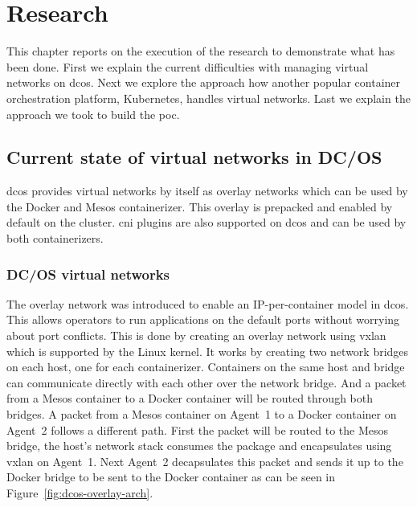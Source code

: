 \chapter{Research}
\label{chap:research}
This chapter reports on the execution of the research to demonstrate what has been done. First we explain the current difficulties with managing virtual networks on \gls{dcos}. Next we explore the approach how another popular container orchestration platform, Kubernetes, handles virtual networks. Last we explain the approach we took to build the \gls{poc}.

\section{Current state of virtual networks in DC/OS}
\label{sec:current-state}
\Gls{dcos} provides virtual networks by itself as overlay networks which can be used by the Docker and Mesos containerizer. This overlay is prepacked and enabled by default on the cluster. \Gls{cni} plugins are also supported on \gls{dcos} and can be used by both containerizers.

\subsection{DC/OS virtual networks}
\label{subsec:dcos-virtual-networks}
The overlay network was introduced to enable an IP-per-container model in \gls{dcos}. This allows operators to run applications on the default ports without worrying about port conflicts. This is done by creating an overlay network using \gls{vxlan}\cite{mahalingam2014virtual} which is supported by the Linux kernel. It works by creating two network bridges on each host, one for each containerizer. Containers on the same host and bridge can communicate directly with each other over the network bridge. And a packet from a Mesos container to a Docker container will be routed through both bridges. A packet from a Mesos container on Agent~1 to a Docker container on Agent~2 follows a different path. First the packet will be routed to the Mesos bridge, the host's network stack consumes the package and encapsulates using \gls{vxlan} on Agent~1. Next Agent~2 decapsulates this packet and sends it up to the Docker bridge to be sent to the Docker container as can be seen in Figure~\ref{fig:dcos-overlay-arch}.

